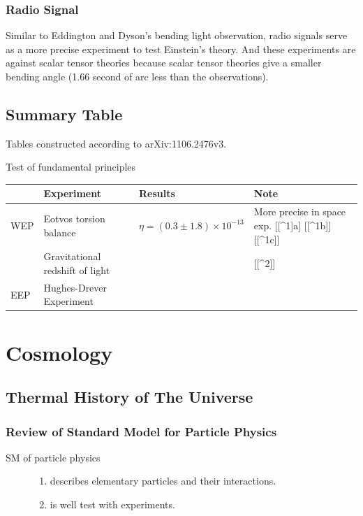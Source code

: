 \documentclass[letterpaper,10pt,english]{sphinxmanual}
\begin{document}
\subsubsection{Radio Signal}
\label{relativity/GeneralRelativityAdv:radio-signal}
Similar to Eddington and Dyson's bending light observation, radio
signals serve as a more precise experiment to test Einstein's theory.
And these experiments are against scalar tensor theories because scalar
tensor theories give a smaller bending angle (1.66 second of arc less
than the observations).


\subsection{Summary Table}
\label{relativity/GeneralRelativityAdv:summary-table}
Tables constructed according to arXiv:1106.2476v3.

Test of fundamental principles

\begin{tabulary}{\linewidth}{|L|L|L|L|}
\hline
\textsf{\relax } & \textsf{\relax 
Experiment
} & \textsf{\relax 
Results
} & \textsf{\relax 
Note
}\\
\hline
WEP
 & 
Eotvos torsion balance
 & 
\(\eta = (0.3 \pm 1.8) \times 10^{-13}\)
 & 
More precise in space exp. {[}{[}\textasciicircum{}1{]}a{]} {[}{[}\textasciicircum{}1b{]}{]} {[}{[}\textasciicircum{}1c{]}{]}
\\
\hline & 
Gravitational redshift of light
 &  & 
{[}{[}\textasciicircum{}2{]}{]}
\\
\hline
EEP
 & 
Hughes-Drever Experiment
 &  & \\
\hline\end{tabulary}



\section{Cosmology}
\label{Cosmology/cosmoIndex::doc}\label{Cosmology/cosmoIndex:cosmology}

\subsection{Thermal History of The Universe}
\label{Cosmology/cosmoIndex:thermal-history-of-the-universe}

\subsubsection{Review of Standard Model for Particle Physics}
\label{Cosmology/cosmoIndex:review-of-standard-model-for-particle-physics}\begin{description}
\item[{SM of particle physics}] \leavevmode\begin{enumerate}
\item {} 
describes elementary particles and their interactions.

\item {} 
is well test with experiments.

\end{enumerate}

\end{description}
\end{document}
